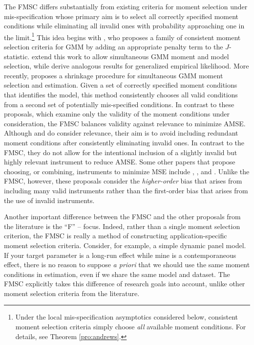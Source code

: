 The FMSC differs substantially from existing criteria for moment selection under mis-specification whose primary aim is to select all correctly specified moment conditions while eliminating all invalid ones with probability approaching one in the limit.\footnote{Under the local mis-specification asymptotics considered below, consistent moment selection criteria simply choose \emph{all} available moment conditions. For details, see Theorem \ref{pro:andrews}.}
This idea begins with \cite{Andrews1999}, who proposes a family of consistent moment selection criteria for GMM by adding an appropriate penalty term to the $J$-statistic. 
\cite{AndrewsLu} extend this work to allow simultaneous GMM moment and model selection, while \cite{HongPrestonShum} derive analogous results for generalized empirical likelihood.
More recently, \cite{Liao} proposes a shrinkage procedure for simultaneous GMM moment selection and estimation. 
Given a set of correctly specified moment conditions that identifies the model, this method consistently chooses all valid conditions from a second set of potentially mis-specified conditions.
In contrast to these proposals, which examine only the validity of the moment conditions under consideration, the FMSC balances validity against relevance to minimize AMSE.
Although \cite{HallPeixe2003} and \cite{ChengLiao} do consider relevance, their aim is to avoid including redundant moment conditions after consistently eliminating invalid ones.
In contrast to the FMSC, they do not allow for the intentional inclusion of a slightly invalid but highly relevant instrument to reduce AMSE. 
Some other papers that propose choosing, or combining, instruments to minimize MSE include \cite{DonaldNewey2001}, \cite{DonaldImbensNewey2009}, and \cite{KuersteinerOkui2010}.
Unlike the FMSC, however, these proposals consider the \emph{higher-order} bias that arises from including many valid instruments rather than the first-order bias that arises from the use of invalid instruments.

Another important difference between the FMSC and the other proposals from the literature is the ``F'' -- focus. 
Indeed, rather than a single moment selection criterion, the FMSC is really a method of constructing application-specific moment selection criteria.
Consider, for example, a simple dynamic panel model. If your target parameter is a long-run effect while mine is a contemporaneous effect, there is no reason to suppose \emph{a priori} that we should use the same moment conditions in estimation, even if we share the same model and dataset.
The FMSC explicitly takes this difference of research goals into account, unlike other moment selection criteria from the literature.

